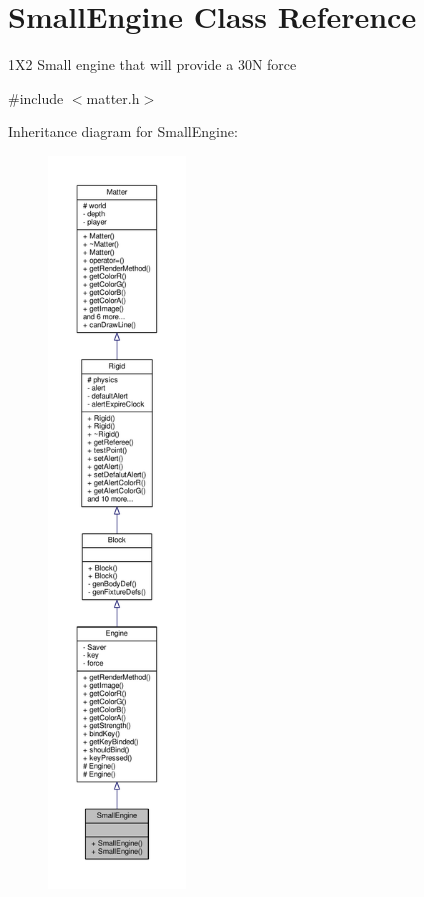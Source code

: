 \hypertarget{classSmallEngine}{}\section{Small\+Engine Class Reference}
\label{classSmallEngine}


1\+X2 Small engine that will provide a 30\+N force  




{\ttfamily \#include $<$matter.\+h$>$}



Inheritance diagram for Small\+Engine\+:
\nopagebreak
\begin{figure}[H]
\begin{center}
\leavevmode
\includegraphics[height=550pt]{classSmallEngine__inherit__graph}
\end{center}
\end{figure}


